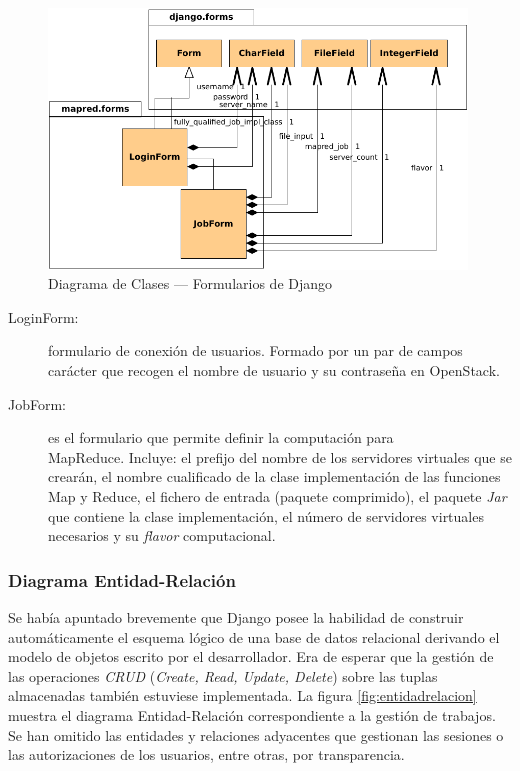 \begin{figure}[tbp]
\begin{center}
\includegraphics[width=0.99\textwidth]{imagenes/031.pdf}
 \caption{Diagrama de Clases --- Formularios de Django}
\label{fig:clasesformulariosdjango}
\end{center}
\end{figure}

\begin{description}
 \item[LoginForm:] formulario de conexi\'on de usuarios. Formado por un par de campos car\'acter que recogen el nombre de usuario y su contrase\~na en OpenStack.
 \item[JobForm:] es el formulario que permite definir la computaci\'on para \\MapReduce. Incluye: el prefijo del nombre de los servidores virtuales que se crear\'an, el nombre cualificado de la clase implementaci\'on de las funciones Map y Reduce, el fichero de entrada (paquete comprimido), el paquete \emph{Jar} que contiene la clase implementaci\'on, el n\'umero de servidores virtuales necesarios y su \emph{flavor} computacional.
\end{description}


\subsubsection{Diagrama Entidad-Relaci\'on}\label{subsubsec:entidadrelacion}
\noindent Se hab\'ia apuntado brevemente que Django posee la habilidad de construir autom\'aticamente el esquema l\'ogico de una base de datos relacional derivando el modelo de objetos escrito por el desarrollador. Era de esperar que la gesti\'on de las operaciones \emph{CRUD} (\emph{Create, Read, Update, Delete}) sobre las tuplas almacenadas tambi\'en estuviese implementada. La figura \ref{fig:entidadrelacion} muestra el diagrama Entidad-Relaci\'on correspondiente a la gesti\'on de trabajos. Se han omitido las entidades y relaciones adyacentes que gestionan las sesiones o las autorizaciones de los usuarios, entre otras, por transparencia.

